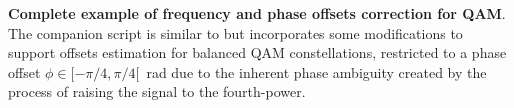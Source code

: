 


%
%
%

\bExample \textbf{Complete example of frequency and phase offsets correction for QAM}.
\label{ex:offsetsQAM}
The companion script  is similar to  but incorporates some modifications to support
offsets estimation for balanced QAM constellations, restricted to a phase offset $\phi \in [-\pi/4, \pi/4[$~rad due to the inherent phase ambiguity created by the process of raising the signal to the fourth-power.


